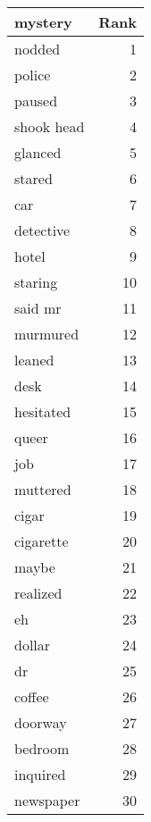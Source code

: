 \begin{table}
\label{tab:mystery_terms}
\begin{tabular}{lr}
\toprule
mystery & Rank \\
\midrule
nodded & 1 \\
police & 2 \\
paused & 3 \\
shook head & 4 \\
glanced & 5 \\
stared & 6 \\
car & 7 \\
detective & 8 \\
hotel & 9 \\
staring & 10 \\
said mr & 11 \\
murmured & 12 \\
leaned & 13 \\
desk & 14 \\
hesitated & 15 \\
queer & 16 \\
job & 17 \\
muttered & 18 \\
cigar & 19 \\
cigarette & 20 \\
maybe & 21 \\
realized & 22 \\
eh & 23 \\
dollar & 24 \\
dr & 25 \\
coffee & 26 \\
doorway & 27 \\
bedroom & 28 \\
inquired & 29 \\
newspaper & 30 \\
\bottomrule
\end{tabular}
\end{table}

